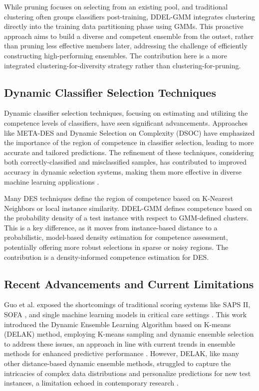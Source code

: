\documentclass[lettersize,journal]{IEEEtran}
\newcommand{\greenhighlight}[1]{\textcolor{highlightgreen}{#1}}
\begin{document}
\greenhighlight{While pruning focuses on selecting from an existing pool, and traditional clustering often groups classifiers post-training, DDEL-GMM integrates clustering directly into the training data partitioning phase using GMMs. This proactive approach aims to build a diverse and competent ensemble from the outset, rather than pruning less effective members later, addressing the challenge of efficiently constructing high-performing ensembles. The contribution here is a more integrated clustering-for-diversity strategy rather than clustering-for-pruning.}

\subsection{Dynamic Classifier Selection Techniques}
\noindent Dynamic classifier selection techniques, focusing on estimating and utilizing the competence levels of classifiers, have seen significant advancements. Approaches like META-DES and Dynamic Selection on Complexity (DSOC) have emphasized the importance of the region of competence in classifier selection, leading to more accurate and tailored predictions. The refinement of these techniques, considering both correctly-classified and misclassified samples, has contributed to improved accuracy in dynamic selection systems, making them more effective in diverse machine learning applications \cite{cruz_dynamic_2018}.

\greenhighlight{Many DES techniques define the region of competence based on K-Nearest Neighbors or local instance similarity. DDEL-GMM defines competence based on the probability density of a test instance with respect to GMM-defined clusters. This is a key difference, as it moves from instance-based distance to a probabilistic, model-based density estimation for competence assessment, potentially offering more robust selections in sparse or noisy regions. The contribution is a density-informed competence estimation for DES.}

\subsection{Recent Advancements and Current Limitations}
\noindent Guo et al. \cite{guo_dynamic_2021} exposed the shortcomings of traditional scoring systems like SAPS II, SOFA \cite{tekin_comparison_2024}, and single machine learning models in critical care settings \cite{sagi_ensemble_2018}. This work introduced the Dynamic Ensemble Learning Algorithm based on K-means (DELAK) method, employing K-means sampling and dynamic ensemble selection to address these issues, an approach in line with current trends in ensemble methods for enhanced predictive performance \cite{dong_survey_2020, jiang_clustering-based_2019}. However, DELAK, like many other distance-based dynamic ensemble methods, struggled to capture the intricacies of complex data distributions and personalize predictions for new test instances, a limitation echoed in contemporary research \cite{mienye_survey_2022, gonzalez_practical_2020}. 
\end{document}
